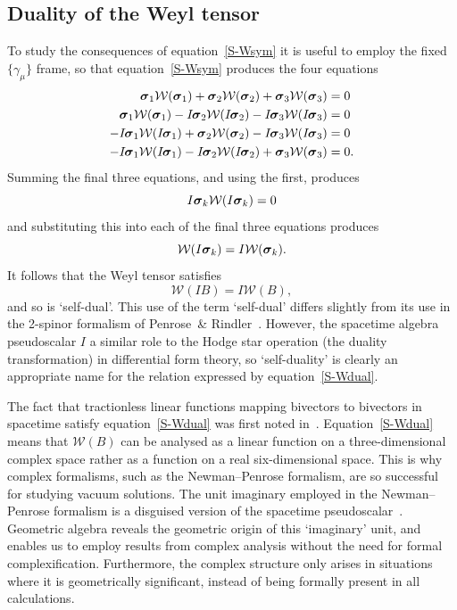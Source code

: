 \documentclass[a4paper]{article}
\numberwithin{equation}{section}
\newcommand{\sig}{\mbox{\boldmath $\sigma$}}
\newcommand{\bsig}{\mbox{\boldmath $\sig$}}
\newcommand{\clw}{{\mathcal{W}}}
\newcommand{\si}{\bsig_1}
\newcommand{\sj}{\bsig_2}
\newcommand{\sk}{\bsig_3}
\newcommand{\isi}{I \hspace{-1pt} \bsig_1}
\newcommand{\isj}{I \hspace{-1pt} \bsig_2}
\newcommand{\isk}{I \hspace{-1pt} \bsig_3}
\newcommand{\sigk}{\bsig_k}
\newcommand{\gamdm}{\gamma_\mu}
\begin{document}
\subsection{Duality of the Weyl tensor}

To study the consequences of equation~\eqref{S-Wsym} it is useful to
employ the fixed $\{\gamdm\}$ frame, so that equation~\eqref{S-Wsym}
produces the four equations
%
\begin{align}
\si\clw(\si) + \sj\clw(\sj) + \sk\clw(\sk) &= 0 \label{S-5} \\ 
\si\clw(\si) - \isj\clw(\isj) - \isk\clw(\isk) &= 0 \\ 
-\isi\clw(\isi) + \sj\clw(\sj) - \isk\clw(\isk) &= 0 \\ 
-\isi\clw(\isi) - \isj\clw(\isj) + \sk\clw(\sk) &= 0. \label{S-6}
\end{align}
%
Summing the final three equations, and using the first, produces
%
\begin{equation}
I\sigk \clw(I\sigk) = 0
\end{equation}
%
and substituting this into each of the final three equations produces
%
\begin{equation}
\clw(I\sigk) = I \clw(\sigk).
\end{equation}
%
It follows that the Weyl tensor satisfies
%
\begin{equation}
\clw(IB) = I \clw(B),
\label{S-Wdual}
\end{equation}
%
and so is `self-dual'.  This use of the term `self-dual' differs
slightly from its use in the 2-spinor formalism of Penrose~\&
Rindler~\cite{pen-I}.  However, the spacetime algebra pseudoscalar $I$
a similar role to the Hodge star operation (the duality
transformation) in differential form theory, so `self-duality' is
clearly an appropriate name for the relation expressed by
equation~\eqref{S-Wdual}.

  
The fact that tractionless linear functions mapping bivectors to
bivectors in spacetime satisfy equation~\eqref{S-Wdual} was first noted
in~\cite{hes-gc}.  Equation~\eqref{S-Wdual} means that $\clw(B)$ can be
analysed as a linear function on a three-dimensional complex space
rather as a function on a real six-dimensional space.  This is why
complex formalisms, such as the Newman--Penrose formalism, are so
successful for studying vacuum solutions.  The unit imaginary employed
in the Newman--Penrose formalism is a disguised version of the
spacetime pseudoscalar~\cite{DGL-polspin}.  Geometric algebra reveals
the geometric origin of this `imaginary' unit, and enables us to
employ results from complex analysis without the need for formal
complexification.  Furthermore, the complex structure only arises in
situations where it is geometrically significant, instead of being
formally present in all calculations.
\end{document}
